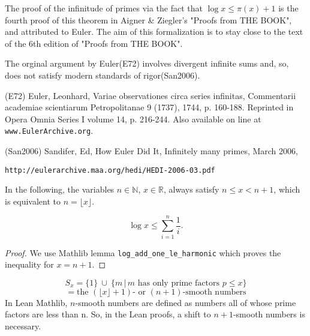 The proof of the infinitude of primes via the fact that $\log x\le \pi(x)+1$ is the fourth proof of this theorem in Aigner \& Ziegler's "Proofs from THE BOOK", and attributed to Euler. The aim of this formalization is to stay close to the text of the 6th edition of "Proofs from THE BOOK".

The orginal argument by Euler(E72) involves divergent infinite sums and, so, does not satisfy
modern standards of rigor(San2006).

(E72)
Euler, Leonhard, Variae observationes circa series infinitas, Commentarii academiae scientiarum
Petropolitanae 9 (1737), 1744, p. 160-188. Reprinted in Opera Omnia Series I volume 14, p. 216-244.
Also available on line at \verb|www.EulerArchive.org|. 

(San2006)
Sandifer, Ed, How Euler Did It, Infinitely many primes, March 2006, \begin{verbatim}http://eulerarchive.maa.org/hedi/HEDI-2006-03.pdf\end{verbatim}

\begin{definition}
\label{def:nx}
In the following, the variables $n\in\mathbb{N}$, $x\in\mathbb{R}$, always satisfy
$n\le x < n+1$, which is equivalent to $n=\lfloor x\rfloor$. 
\end{definition}


\begin{lemma}
\label{lem:lemma0}
\leanok
$$\log x \le \sum_{i=1}^n\frac1i.$$
\end{lemma}
\begin{proof}
\leanok
    We use Mathlib lemma \verb|log_add_one_le_harmonic| which proves the inequality for $x=n+1$. 
\end{proof}

\begin{definition}
\label{def:S}
\leanok
    $$ S_x = \{1\}\ \cup\ \{m\,\big|\, \text{$m$ has only prime factors $p\le x$}\} $$
    $$ = \text{the $(\lfloor x\rfloor +1)$- or $(n+1)$-smooth numbers} $$
In Lean Mathlib, $n$-smooth numbers are defined as numbers all of whose prime factors are less than n.
So, in the Lean proofs, a shift to $n+1$-smooth numbers is necessary.
\end{definition}


